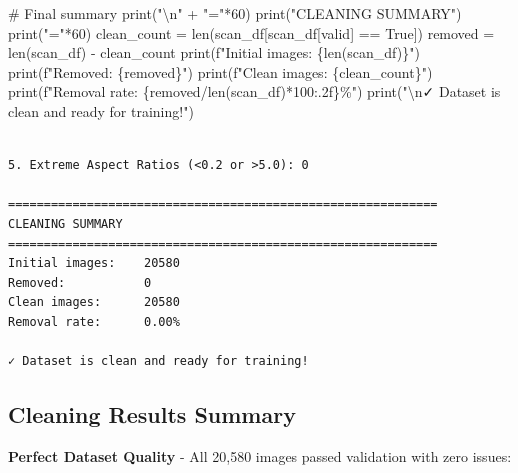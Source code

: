 \documentclass[
  letterpaper,
  DIV=11,
  numbers=noendperiod]{scrartcl}
\newenvironment{Shaded}{\begin{snugshade}}{\end{snugshade}}
\newcommand{\BuiltInTok}[1]{\textcolor[rgb]{0.00,0.23,0.31}{#1}}
\newcommand{\CharTok}[1]{\textcolor[rgb]{0.13,0.47,0.30}{#1}}
\newcommand{\CommentTok}[1]{\textcolor[rgb]{0.37,0.37,0.37}{#1}}
\newcommand{\DecValTok}[1]{\textcolor[rgb]{0.68,0.00,0.00}{#1}}
\newcommand{\NormalTok}[1]{\textcolor[rgb]{0.00,0.23,0.31}{#1}}
\newcommand{\OperatorTok}[1]{\textcolor[rgb]{0.37,0.37,0.37}{#1}}
\newcommand{\SpecialCharTok}[1]{\textcolor[rgb]{0.37,0.37,0.37}{#1}}
\newcommand{\SpecialStringTok}[1]{\textcolor[rgb]{0.13,0.47,0.30}{#1}}
\newcommand{\StringTok}[1]{\textcolor[rgb]{0.13,0.47,0.30}{#1}}
\newcommand{\VariableTok}[1]{\textcolor[rgb]{0.07,0.07,0.07}{#1}}
\renewenvironment{Shaded}{%
  \begin{tcolorbox}[%
    enhanced,%
    colback=codebg,%
    colframe=codebg,%
    borderline west={3pt}{0pt}{sectionblue},%
    boxrule=0pt,%
    arc=0pt,%
    boxsep=5pt,%
    left=2mm,%
    right=2mm,%
    top=2mm,%
    bottom=2mm%
  ]%
}{%
  \end{tcolorbox}%
}
\begin{document}
\begin{Shaded}
\begin{Highlighting}[]
\CommentTok{\# Final summary}
\BuiltInTok{print}\NormalTok{(}\StringTok{"}\CharTok{\textbackslash{}n}\StringTok{"} \OperatorTok{+} \StringTok{"="}\OperatorTok{*}\DecValTok{60}\NormalTok{)}
\BuiltInTok{print}\NormalTok{(}\StringTok{"CLEANING SUMMARY"}\NormalTok{)}
\BuiltInTok{print}\NormalTok{(}\StringTok{"="}\OperatorTok{*}\DecValTok{60}\NormalTok{)}
\NormalTok{clean\_count }\OperatorTok{=} \BuiltInTok{len}\NormalTok{(scan\_df[scan\_df[}\StringTok{\textquotesingle{}valid\textquotesingle{}}\NormalTok{] }\OperatorTok{==} \VariableTok{True}\NormalTok{])}
\NormalTok{removed }\OperatorTok{=} \BuiltInTok{len}\NormalTok{(scan\_df) }\OperatorTok{{-}}\NormalTok{ clean\_count}
\BuiltInTok{print}\NormalTok{(}\SpecialStringTok{f"Initial images:    }\SpecialCharTok{\{}\BuiltInTok{len}\NormalTok{(scan\_df)}\SpecialCharTok{\}}\SpecialStringTok{"}\NormalTok{)}
\BuiltInTok{print}\NormalTok{(}\SpecialStringTok{f"Removed:           }\SpecialCharTok{\{}\NormalTok{removed}\SpecialCharTok{\}}\SpecialStringTok{"}\NormalTok{)}
\BuiltInTok{print}\NormalTok{(}\SpecialStringTok{f"Clean images:      }\SpecialCharTok{\{}\NormalTok{clean\_count}\SpecialCharTok{\}}\SpecialStringTok{"}\NormalTok{)}
\BuiltInTok{print}\NormalTok{(}\SpecialStringTok{f"Removal rate:      }\SpecialCharTok{\{}\NormalTok{removed}\OperatorTok{/}\BuiltInTok{len}\NormalTok{(scan\_df)}\OperatorTok{*}\DecValTok{100}\SpecialCharTok{:.2f\}}\SpecialStringTok{\%"}\NormalTok{)}
\BuiltInTok{print}\NormalTok{(}\StringTok{"}\CharTok{\textbackslash{}n}\StringTok{✓ Dataset is clean and ready for training!"}\NormalTok{)}
\end{Highlighting}
\end{Shaded}

\begin{verbatim}

5. Extreme Aspect Ratios (<0.2 or >5.0): 0

============================================================
CLEANING SUMMARY
============================================================
Initial images:    20580
Removed:           0
Clean images:      20580
Removal rate:      0.00%

✓ Dataset is clean and ready for training!
\end{verbatim}

\subsection{Cleaning Results Summary}\label{cleaning-results-summary}

\textbf{Perfect Dataset Quality} - All 20,580 images passed validation
with zero issues:
\end{document}

